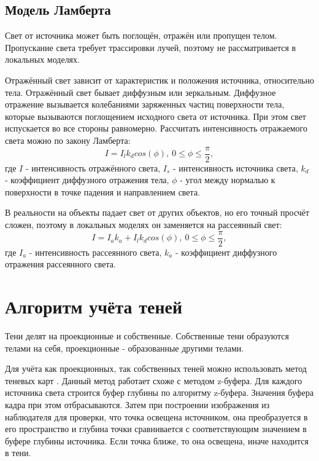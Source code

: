 \subsection{Модель Ламберта}
Свет от источника может быть поглощён, отражён или пропущен телом. Пропускание света требует трассировки лучей, поэтому не рассматривается в локальных моделях.

Отражённый свет зависит от характеристик и положения источника, относительно тела. Отражённый свет бывает диффузным или зеркальным. Диффузное отражение вызывается колебаниями заряженных частиц поверхности тела, которые вызываются поглощением исходного света от источника. При этом свет испускается во все стороны равномерно. Рассчитать интенсивность отражаемого света можно по закону Ламберта:
\begin{equation}
	\label{eq:lambert1}
	I = I_{l}k_dcos(\phi),\ 0\leq\phi\leq\frac{\pi}{2},
\end{equation}
где $I$ - интенсивность отражённого света, $I_s$ - интенсивность источника света, $k_d$ - коэффициент диффузного отражения тела, $\phi$ - угол между нормалью к поверхности в точке падения и направлением света.

В реальности на объекты падает свет от других объектов, но его точный просчёт сложен, поэтому в локальных моделях он заменяется на рассеянный свет:
\begin{equation}
	\label{eq:lambert2}
	I = I_ak_a + I_{l}k_dcos(\phi),\ 0\leq\phi\leq\frac{\pi}{2},
\end{equation}
где $I_a$ - интенсивность рассеянного света, $k_a$ - коэффициент диффузного отражения рассеянного света. 

\section{Алгоритм учёта теней}

Тени делят на проекционные и собственные. Собственные тени образуются телами на себя, проекционные - образованные другими телами.

Для учёта как проекционных, так собственных теней можно использовать метод теневых карт \cite{gabriella}. Данный метод работает схоже с методом z-буфера. Для каждого источника света строится буфер глубины по алгоритму z-буфера. Значения буфера кадра при этом отбрасываются. Затем при построении изображения из наблюдателя для проверки, что точка освещена источником, она преобразуется в его пространство и глубина точки сравнивается с соответствующим значением в буфере глубины источника. Если точка ближе, то она освещена, иначе находится в тени.

